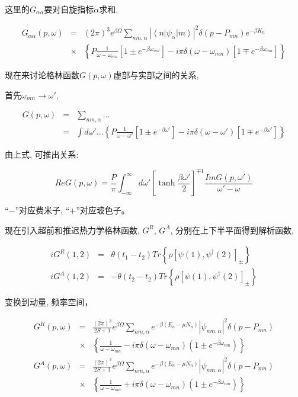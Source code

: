 这里的$G_{\alpha \alpha}$要对自旋指标$\alpha$求和,

\begin{eqnarray*}
G_{\alpha \alpha} (p, \omega) &=& (2\pi)^3 e^{\beta \Omega} \sum_{nm,\alpha} | \left\langle n \right| \psi_\alpha \left| m \right\rangle  |^2 \delta(p-P_{mn}) e^{-\beta K_n}    \\
  {} & \times & \left\{ P \frac{1}{\omega - \omega_{mn}} [1 \pm e^{-\beta \omega_{mn}}] - i \pi \delta(\omega - \omega_{mn}) [1 \mp e^{-\beta \omega_{mn}}] \right\}
\end{eqnarray*}

现在来讨论格林函数$G(p, \omega)$虚部与实部之间的关系,

首先$\omega_{mn} \to \omega'$,

\begin{eqnarray*}
  G(p, \omega) &=& \sum_{nm, \alpha} ... \\
  {} &=& \int d \omega' ...\left\{ P
\frac{1}{\omega - \omega'} [1 \pm e^{-\beta \omega'}] - i \pi
\delta(\omega - \omega') [1 \mp e^{-\beta \omega'}] \right\}
\end{eqnarray*}

由上式, 可推出关系:

\begin{equation*}
Re G(p, \omega) = \frac{P}{\pi} \int_{-\infty}^{\infty} d\omega'
\left[ \tanh \frac{\beta \omega'}{2} \right]^{\mp 1} \frac{Im G(p,
\omega')}{\omega' - \omega}
\end{equation*}


``$-$''对应费米子, ``$+$''对应玻色子。

现在引入超前和推迟热力学格林函数, $G^R$, $G^A$,
分别在上下半平面得到解析函数,

\begin{eqnarray*}
iG^R(1,2) &=& \theta(t_1 - t_2) Tr \left\{ \rho [\psi(1), \psi^\dagger(2)]_{\pm} \right\} \\
iG^A(1,2) &=& - \theta(t_2 - t_2) Tr \left\{ \rho [\psi(1),
\psi^\dagger(2)]_{\pm} \right\}
\end{eqnarray*}

变换到动量, 频率空间，

\begin{eqnarray*}
G^R (p, \omega) &=& \frac{(2\pi)^3}{2S+1} e^{\beta
\Omega}\sum_{nm,\alpha} e^{-\beta (E_n - \mu N_n)}
\left|\psi_{nm,\alpha} \right|^2 \delta(p-P_{mn}) \\
{} & \times & \left\{ \frac{1}{\omega - \omega_{mn}} -i \pi \delta(\omega -\omega_{mn}) (1 \pm e^{-\beta \omega_{mn}}) \right\}  \\
G^A(p, \omega) &=& \frac{(2\pi)^3}{2S+1} e^{\beta
\Omega}\sum_{nm,\alpha} e^{-\beta (E_n - \mu N_n)}
\left|\psi_{nm,\alpha} \right|^2 \delta(p-P_{mn}) \\
{} & \times &  \left\{ \frac{1}{\omega - \omega_{mn}} + i \pi
\delta(\omega -\omega_{mn}) (1 \pm e^{-\beta \omega_{mn}}) \right\}
\end{eqnarray*}



